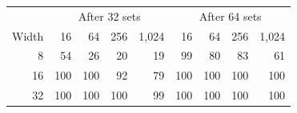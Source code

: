 \begin{tabular}{@{}rrrrr@{\qquad}rrrr@{}}
\toprule
 & \multicolumn{4}{c}{After 32 sets} & \multicolumn{4}{c}{After 64 sets} \\
Width & 16 & 64 & 256 & 1{,}024 & 16 & 64 & 256 & 1{,}024 \\
\midrule
8 & 54 & 26 & 20 & 19 & 99 & 80 & 83 & 61 \\
16 & 100 & 100 & 92 & 79 & 100 & 100 & 100 & 100 \\
32 & 100 & 100 & 100 & 99 & 100 & 100 & 100 & 100 \\
\bottomrule
\end{tabular}
